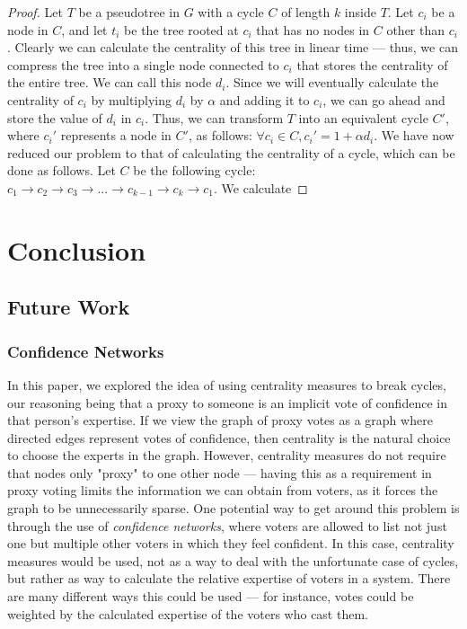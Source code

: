 \documentclass[10pt]{article}
\theoremstyle{definition}
\begin{document}
\begin{proof}
Let $T$ be a pseudotree in $G$ with a cycle $C$ of length $k$ inside $T$. Let $c_i$ be a node in $C$, and let $t_i$ be the tree rooted at  $c_i$ that has no nodes in $C$ other than $c_i$. Clearly we can calculate the centrality of this tree in linear time --- thus, we can compress the tree into a single node connected to $c_i$ that stores the centrality of the entire tree. We can call this node $d_i$. Since we will eventually calculate the centrality of $c_i$ by multiplying $d_i$ by $\alpha$ and adding it to $c_i$, we can go ahead and store the value of $d_i$ in $c_i$. Thus, we can transform $T$ into an equivalent cycle $C'$, where $c_i'$ represents a node in $C'$, as follows: $\forall c_i \in C, c_i' = 1 + \alpha d_i$.  We have now reduced our problem to that of calculating the centrality of a cycle, which can be done as follows. Let $C$ be the following cycle: $c_1 \rightarrow c_2 \rightarrow c_3 \rightarrow ... \rightarrow c_{k-1} \rightarrow c_k \rightarrow c_1$.  We calculate 
\end{proof}



\section{Conclusion}

\subsection{Future Work}
\subsubsection{Confidence Networks}

In this paper, we explored the idea of using centrality measures to break cycles, our reasoning being that a proxy to someone is an implicit vote of confidence in that person's expertise. If we view the graph of proxy votes as a graph where directed edges represent votes of confidence, then centrality is the natural choice to choose the experts in the graph. However, centrality measures do not require that nodes only "proxy" to one other node --- having this as a requirement in proxy voting limits the information we can obtain from voters, as it forces the graph to be unnecessarily sparse. One potential way to get around this problem is through the use of \textit{confidence networks}, where voters are allowed to list not just one but multiple other voters in which they feel confident. In this case, centrality measures would be used, not as a way to deal with the unfortunate case of cycles, but rather as way to calculate the relative expertise of voters in a system. There are many different ways this could be used --- for instance, votes could be weighted by the calculated expertise of the voters who cast them.
\end{document}
